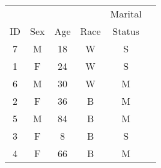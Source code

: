 \begin{tabular}{cccccc}
   &     &     &      & Marital \\
ID & Sex & Age & Race & Status \\
\hline
7  & M  & 18  & W & S  \\
1  & F  & 24  & W & S  \\
6  & M  & 30  & W & M  \\
2  & F  & 36  & B & M  \\
5  & M  & 84  & B & M  \\
3  & F  & 8   & B & S  \\
4  & F  & 66  & B & M  \\
\hline
\end{tabular}
